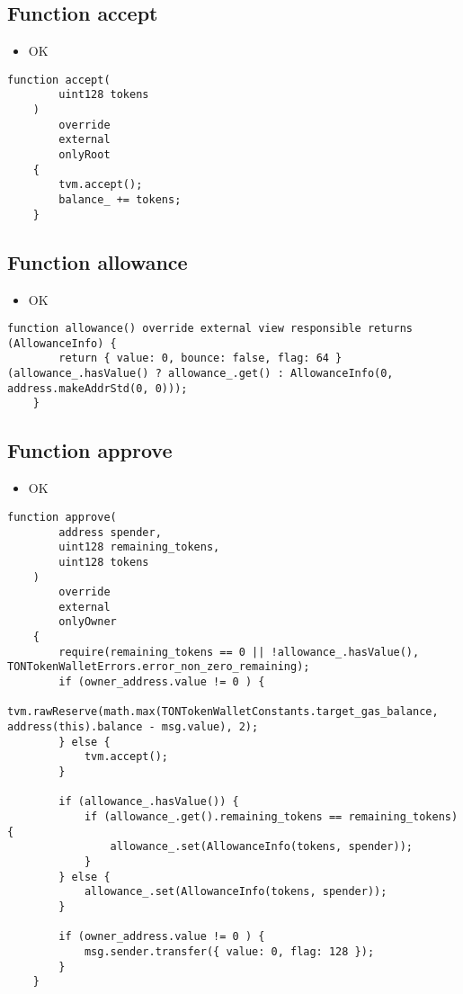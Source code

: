 \subsection{Function accept}

\begin{itemize}
\item OK
\end{itemize}

\begin{lstlisting}[firstnumber=96]
    function accept(
        uint128 tokens
    )
        override
        external
        onlyRoot
    {
        tvm.accept();
        balance_ += tokens;
    }
\end{lstlisting}

\subsection{Function allowance}

\begin{itemize}
\item OK
\end{itemize}

\begin{lstlisting}[firstnumber=107]
    function allowance() override external view responsible returns (AllowanceInfo) {
        return { value: 0, bounce: false, flag: 64 } (allowance_.hasValue() ? allowance_.get() : AllowanceInfo(0, address.makeAddrStd(0, 0)));
    }
\end{lstlisting}

\subsection{Function approve}

\begin{itemize}
\item OK
\end{itemize}

\begin{lstlisting}[firstnumber=119]
    function approve(
        address spender,
        uint128 remaining_tokens,
        uint128 tokens
    )
        override
        external
        onlyOwner
    {
        require(remaining_tokens == 0 || !allowance_.hasValue(), TONTokenWalletErrors.error_non_zero_remaining);
        if (owner_address.value != 0 ) {
            tvm.rawReserve(math.max(TONTokenWalletConstants.target_gas_balance, address(this).balance - msg.value), 2);
        } else {
            tvm.accept();
        }

        if (allowance_.hasValue()) {
            if (allowance_.get().remaining_tokens == remaining_tokens) {
                allowance_.set(AllowanceInfo(tokens, spender));
            }
        } else {
            allowance_.set(AllowanceInfo(tokens, spender));
        }

        if (owner_address.value != 0 ) {
            msg.sender.transfer({ value: 0, flag: 128 });
        }
    }
\end{lstlisting}

